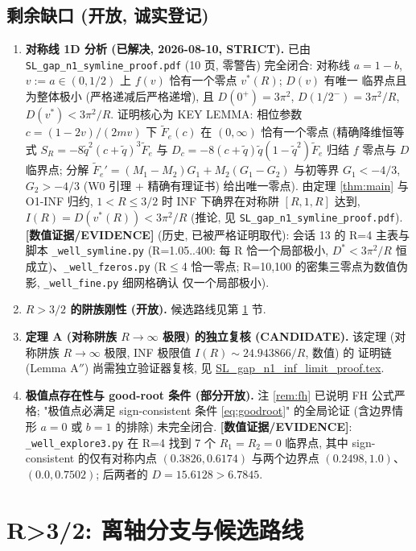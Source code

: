 \documentclass[UTF8]{ctexart}
\newcommand{\EVID}{\textbf{[数值证据/EVIDENCE]}}
\begin{document}
\subsection{剩余缺口 (开放, 诚实登记)}\label{sec:gaps-open}
\begin{enumerate}
	\item[(a)] \textbf{对称线 1D 分析 (已解决, 2026-08-10, STRICT).} 已由
		\texttt{SL\_gap\_n1\_symline\_proof.pdf} (10 页, 零警告) 完全闭合: 对称线
		$a=1-b$, $v:=a\in(0,1/2)$ 上 $f(v)$ 恰有一个零点 $v^*(R)$; $D(v)$ 有唯一
		临界点且为整体极小 (严格递减后严格递增), 且 $D(0^+)=3\pi^2$,
		$D(1/2^-)=3\pi^2/R$, $D(v^*)<3\pi^2/R$. 证明核心为 KEY LEMMA: 相位参数
		$c=(1-2v)/(2mv)$ 下 $\widetilde F_e(c)$ 在 $(0,\infty)$ 恰有一个零点
		(精确降维恒等式 $S_R=-8\tilde q^2(c+\tilde q)^3\widetilde F_e$ 与
		$D_c=-8(c+\tilde q)\tilde q(1-\tilde q^2)\widetilde F_e$ 归结 $f$ 零点与
		$D$ 临界点; 分解 $\widetilde F_e'=(M_1-M_2)G_1+M_2(G_1-G_2)$ 与初等界
		$G_1<-4/3$, $G_2>-4/3$ (W0 引理 + 精确有理证书) 给出唯一零点).
		由定理 \ref{thm:main} 与 O1-INF 归约, $1<R\le3/2$ 时 INF 下确界在对称阱
		$[R,1,R]$ 达到, $I(R)=D(v^*(R))<3\pi^2/R$ (推论, 见
		\texttt{SL\_gap\_n1\_symline\_proof.pdf}).
		\EVID{} (历史, 已被严格证明取代): 会话 13 的 R=4 主表与脚本
		\texttt{\_well\_symline.py} (R=1.05..400: 每 R 恰一个局部极小,
		$D^*<3\pi^2/R$ 恒成立)、\texttt{\_well\_fzeros.py} (R$\le$4 恰一零点;
		R=10,100 的密集三零点为数值伪影, \texttt{\_well\_fine.py} 细网格确认
		仅一个局部极小).
	\item[(b)] \textbf{$R>3/2$ 的阱族刚性 (开放).} 候选路线见第 \ref{sec:route} 节.
	\item[(c)] \textbf{定理 A (对称阱族 $R\to\infty$ 极限) 的独立复核 (CANDIDATE).}
		该定理 (对称阱族 $R\to\infty$ 极限, INF 极限值 $I(R)\sim 24.943866/R$, 数值) 的
		证明链 (Lemma A$''$) 尚需独立验证器复核, 见 \url{SL_gap_n1_inf_limit_proof.tex}.
	\item[(d)] \textbf{极值点存在性与 good-root 条件 (部分开放).} 注 \ref{rem:fh}
		已说明 FH 公式严格; "极值点必满足 sign-consistent 条件 \eqref{eq:goodroot}"
		的全局论证 (含边界情形 $a=0$ 或 $b=1$ 的排除) 未完全闭合.
		\EVID{}: \texttt{\_well\_explore3.py} 在 R=4 找到 7 个 $R_1=R_2=0$ 临界点,
		其中 sign-consistent 的仅有对称内点 $(0.3826,0.6174)$ 与两个边界点
		$(0.2498,1.0)$、$(0.0,0.7502)$; 后两者的 $D=15.6128>6.7845$.
\end{enumerate}

\section{R>3/2: 离轴分支与候选路线}\label{sec:route}
\end{document}
